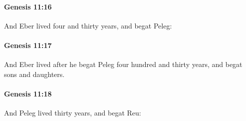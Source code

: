 		\paragraph{Genesis 11:16} %
			\label{GENESIS-11-16}

			And Eber lived four and thirty years, and begat Peleg:


		\paragraph{Genesis 11:17} %
			\label{GENESIS-11-17}

			And Eber lived after he begat Peleg four hundred and thirty years, and begat sons and daughters.


		\paragraph{Genesis 11:18} %
			\label{GENESIS-11-18}

			And Peleg lived thirty years, and begat Reu:


